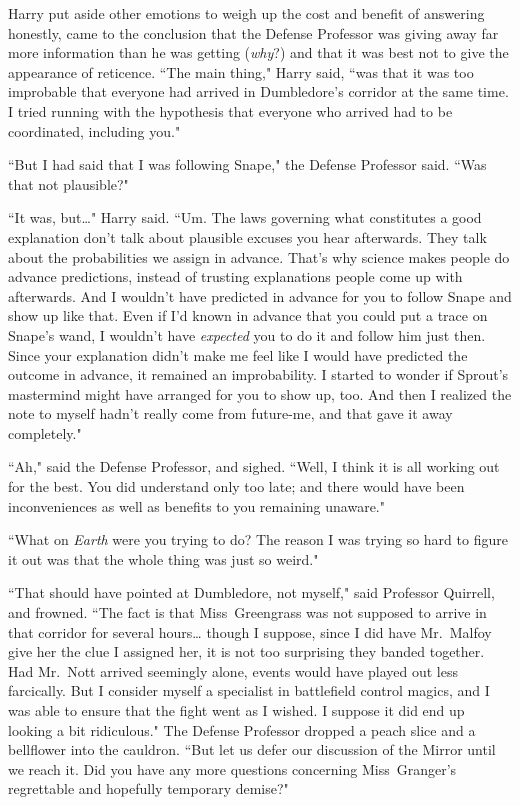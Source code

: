 Harry put aside other emotions to weigh up the cost and benefit of answering honestly, came to the conclusion that the Defense Professor was giving away far more information than he was getting (\emph{why}?) and that it was best not to give the appearance of reticence. ``The main thing," Harry said, ``was that it was too improbable that everyone had arrived in Dumbledore's corridor at the same time. I tried running with the hypothesis that everyone who arrived had to be coordinated, including you."

``But I had said that I was following Snape," the Defense Professor said. ``Was that not plausible?"

``It was, but{\ldots}" Harry said. ``Um. The laws governing what constitutes a good explanation don't talk about plausible excuses you hear afterwards. They talk about the probabilities we assign in advance. That's why science makes people do advance predictions, instead of trusting explanations people come up with afterwards. And I wouldn't have predicted in advance for you to follow Snape and show up like that. Even if I'd known in advance that you could put a trace on Snape's wand, I wouldn't have \emph{expected} you to do it and follow him just then. Since your explanation didn't make me feel like I would have predicted the outcome in advance, it remained an improbability. I started to wonder if Sprout's mastermind might have arranged for you to show up, too. And then I realized the note to myself hadn't really come from future-me, and that gave it away completely."

``Ah," said the Defense Professor, and sighed. ``Well, I think it is all working out for the best. You did understand only too late; and there would have been inconveniences as well as benefits to you remaining unaware."

``What on \emph{Earth} were you trying to do? The reason I was trying so hard to figure it out was that the whole thing was just so weird."

``That should have pointed at Dumbledore, not myself," said Professor Quirrell, and frowned. ``The fact is that Miss~Greengrass was not supposed to arrive in that corridor for several hours{\ldots} though I suppose, since I did have Mr.~Malfoy give her the clue I assigned her, it is not too surprising they banded together. Had Mr.~Nott arrived seemingly alone, events would have played out less farcically. But I consider myself a specialist in battlefield control magics, and I was able to ensure that the fight went as I wished. I suppose it did end up looking a bit ridiculous." The Defense Professor dropped a peach slice and a bellflower into the cauldron. ``But let us defer our discussion of the Mirror until we reach it. Did you have any more questions concerning Miss~Granger's regrettable and hopefully temporary demise?"


